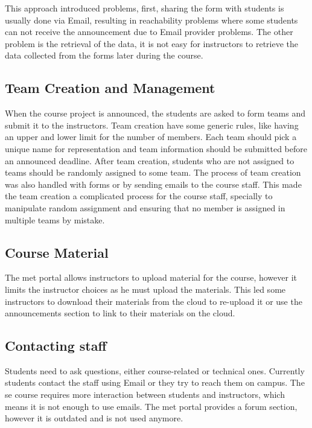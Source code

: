 \newParagraph
This approach introduced problems, first, sharing the form with students is usually done via Email,
resulting in reachability problems where some students can not receive the announcement due to Email provider problems.
The other problem is the retrieval of the data, it is not easy for instructors to retrieve
the data collected from the forms later during the course.

\subsection{Team Creation and Management}
\label{sub:team-management}
When the course project is announced, the students are asked to form teams and submit it to the instructors. Team creation
have some generic rules, like having an upper and lower limit for the number of members. Each team should pick
a unique name for representation and team information should be submitted before an announced deadline. After team creation, students
who are not assigned to teams should be randomly assigned to some team. The process of team
creation was also handled with forms or by sending emails to the course staff. This made the team creation a complicated
process for the course staff, specially to manipulate random assignment and ensuring that no member is assigned in multiple teams
by mistake.

\subsection{Course Material}
\label{sub:course-material}
The \ac{met} portal allows instructors to upload material for the course, however it limits the instructor choices as
he must upload the materials. This led some instructors to download their materials from the cloud
to re-upload it or use the announcements section to link to their materials on the cloud.

\subsection{Contacting staff}
\label{sub:contacting-staff}
Students need to ask questions, either course-related or technical ones. Currently students contact the staff using Email or they try to reach them on
campus. The \ac{se} course requires more interaction between students and instructors, which means
it is not enough to use emails. The \ac{met} portal provides a forum section, however it is outdated and is not used anymore.

